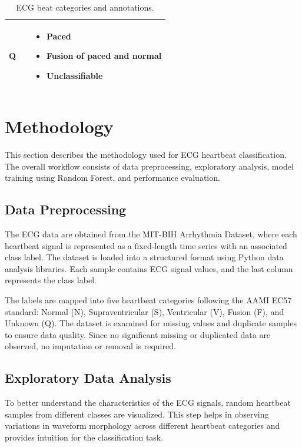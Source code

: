\documentclass[conference]{IEEEtran}
\begin{document}
\begin{table}[H]
\begin{tabularx}{\columnwidth}{>{\bfseries}p{1.2cm} >{\centering\arraybackslash}p{1.2cm} X}
Q & 4 &
\begin{itemize}[leftmargin=1.0em, topsep=0pt, itemsep=0pt, parsep=0pt]
  \item Paced
  \item Fusion of paced and normal
  \item Unclassifiable
\end{itemize}
\\ \hline

\end{tabularx}

\vspace{4pt}
\caption{ECG beat categories and annotations.}
\label{tab:ecg_labels}
\end{table}

\section{Methodology}

This section describes the methodology used for ECG heartbeat classification. The overall workflow consists of data preprocessing, exploratory analysis, model training using Random Forest, and performance evaluation.

\subsection{Data Preprocessing}
The ECG data are obtained from the MIT-BIH Arrhythmia Dataset, where each heartbeat signal is represented as a fixed-length time series with an associated class label. The dataset is loaded into a structured format using Python data analysis libraries. Each sample contains ECG signal values, and the last column represents the class label.

The labels are mapped into five heartbeat categories following the AAMI EC57 standard: Normal (N), Supraventricular (S), Ventricular (V), Fusion (F), and Unknown (Q). The dataset is examined for missing values and duplicate samples to ensure data quality. Since no significant missing or duplicated data are observed, no imputation or removal is required.

\subsection{Exploratory Data Analysis}
To better understand the characteristics of the ECG signals, random heartbeat samples from different classes are visualized. This step helps in observing variations in waveform morphology across different heartbeat categories and provides intuition for the classification task.
\end{document}
